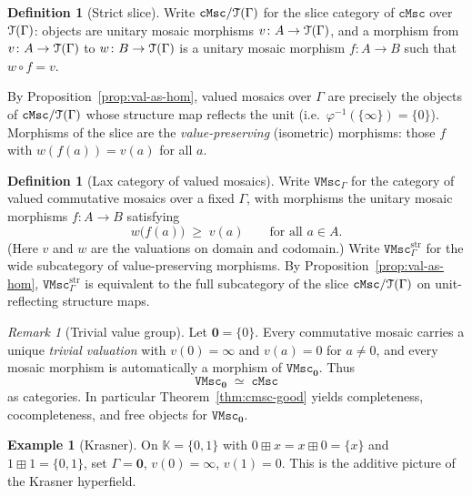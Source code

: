 \documentclass[11pt]{amsart}
\theoremstyle{plain}
\theoremstyle{definition}
\newtheorem{definition}[theorem]{Definition}
\newtheorem{example}[theorem]{Example}
\theoremstyle{remark}
\newtheorem{remark}[theorem]{Remark}
\newcommand{\T}{\EuScript{T}}
\newcommand{\cMsc}{\mathtt{cMsc}}
\newcommand{\VMsc}{\mathtt{VMsc}}
\newcommand{\VMscG}{\mathtt{VMsc}_{\Gamma}}
\begin{document}
\begin{definition}[Strict slice]
\label{def:strict-slice}
Write \(\cMsc/\T(\Gamma)\) for the slice category of \(\cMsc\) over \(\T(\Gamma)\): objects are unitary mosaic morphisms \(v\colon A\to\T(\Gamma)\), and a morphism from \(v\colon A\to\T(\Gamma)\) to \(w\colon B\to\T(\Gamma)\) is a unitary mosaic morphism \(f\colon A\to B\) such that \(w\circ f=v\).
\end{definition}

By Proposition~\ref{prop:val-as-hom}, valued mosaics over \(\Gamma\) are precisely the objects of \(\cMsc/\T(\Gamma)\) whose structure map reflects the unit (i.e.\ \(\varphi^{-1}(\{\infty\})=\{0\}\)). Morphisms of the slice are the \emph{value-preserving} (isometric) morphisms: those \(f\) with \(w(f(a))=v(a)\) for all \(a\). 

\begin{definition}[Lax category of valued mosaics]
\label{def:vmsc-slice}
Write \(\VMscG\) for the category of valued commutative mosaics over a fixed \(\Gamma\), with morphisms the unitary mosaic morphisms \(f\colon A\to B\) satisfying
\begin{equation}
\label{eq:slice-morph}
w\bigl(f(a)\bigr)\;\ge\;v(a)\qquad\text{for all }a\in A.
\end{equation}
(Here \(v\) and \(w\) are the valuations on domain and codomain.) Write \(\VMscG^{\mathrm{str}}\) for the wide subcategory of value-preserving morphisms. By Proposition~\ref{prop:val-as-hom}, \(\VMscG^{\mathrm{str}}\) is equivalent to the full subcategory of the slice \(\cMsc/\T(\Gamma)\) on unit-reflecting structure maps.
\end{definition}

\begin{remark}[Trivial value group]
\label{rem:triv-equiv}
Let \(\mathbf{0}=\{0\}\). Every commutative mosaic carries a unique \emph{trivial valuation} with \(v(0)=\infty\) and \(v(a)=0\) for \(a\neq 0\), and every mosaic morphism is automatically a morphism of \(\VMsc_{\mathbf{0}}\). Thus
\[
\VMsc_{\mathbf{0}}\;\simeq\;\cMsc
\]
as categories. In particular Theorem~\ref{thm:cmsc-good} yields completeness, cocompleteness, and free objects for \(\VMsc_{\mathbf{0}}\).
\end{remark}

\begin{example}[Krasner]
\label{ex:K-val}
On \(\mathbb{K}=\{0,1\}\) with \(0\boxplus x=x\boxplus 0=\{x\}\) and \(1\boxplus 1=\{0,1\}\), set \(\Gamma=\mathbf{0}\), \(v(0)=\infty\), \(v(1)=0\). This is the additive picture of the Krasner hyperfield.
\end{example}
\end{document}
